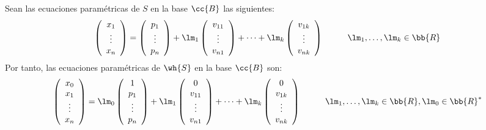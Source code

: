 Sean las ecuaciones paramétricas de $S$ en la base $\cc{B}$ las siguientes:
\begin{equation*}
    \left(\begin{array}{c}
        x_1 \\ \vdots \\ x_n
    \end{array}\right)
    = \left(\begin{array}{c}
        p_1 \\ \vdots \\ p_n
    \end{array}\right)
    + \lm_1 \left(\begin{array}{c}
        v_{11} \\ \vdots \\ v_{n1}
    \end{array}\right)
    + \dots
    + \lm_k \left(\begin{array}{c}
        v_{1k} \\ \vdots \\ v_{nk}
    \end{array}\right) \hspace{1cm} \lm_1,\dots,\lm_k \in \bb{R}
\end{equation*}
Por tanto, las ecuaciones paramétricas de $\wh{S}$ en la base $\cc{B}$ son:
\begin{equation*}
    \left(\begin{array}{c}
        x_0 \\ x_1 \\ \vdots \\ x_n
    \end{array}\right)
    = \lm_0 \left(\begin{array}{c}
        1 \\ p_1 \\ \vdots \\ p_n
    \end{array}\right)
    + \lm_1 \left(\begin{array}{c}
        0 \\ v_{11} \\ \vdots \\ v_{n1}
    \end{array}\right)
    + \dots
    + \lm_k \left(\begin{array}{c}
        0 \\ v_{1k} \\ \vdots \\ v_{nk}
    \end{array}\right) \hspace{1cm} \lm_1,\dots,\lm_k \in \bb{R}, \lm_0 \in \bb{R}^\ast
\end{equation*}
\vspace{1cm}

